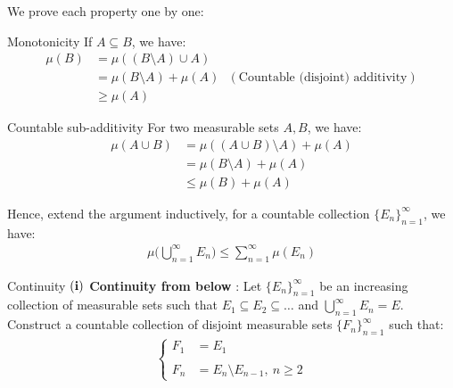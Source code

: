 \begin{proof*}
    We prove each property one by one:
    \begin{subproof}{\newline Monotonicity}
        If $A \subseteq B$, we have:
        \begin{align*}
            \mu(B) &= \mu((B\setminus A) \cup A) \\
            &= \mu(B \setminus A) + \mu(A) \ \ \ (\text{Countable (disjoint) additivity}) \\
            &\ge \mu(A)
        \end{align*}
    \end{subproof}

    \begin{subproof}{\newline Countable sub-additivity}
        For two measurable sets $A, B$, we have:
        \begin{align*}
            \mu(A\cup B) &= \mu((A\cup B)\setminus A) + \mu(A) \\
            &= \mu(B\setminus A) + \mu(A) \\
            &\le \mu(B) + \mu(A)
        \end{align*}

        \noindent Hence, extend the argument inductively, for a countable collection $\{E_n\}_{n=1}^\infty$, we have:
        \begin{align*}
            \mu\Big( \bigcup_{n=1}^\infty E_n \Big) \le \sum_{n=1}^\infty \mu(E_n)
        \end{align*}
    \end{subproof}

    \begin{subproof}{\newline Continuity}
        \textbf{$\bf (i)$ Continuity from below} : Let $\{E_n\}_{n=1}^\infty$ be an increasing collection of measurable sets such that $E_1\subseteq E_2 \subseteq \dots$ and $\bigcup_{n=1}^\infty E_n = E$. Construct a countable collection of disjoint measurable sets $\{F_n\}_{n=1}^\infty$ such that:
        \begin{align*}
            \begin{cases}
                F_1 &= E_1
                \\ \\
                F_n &= E_n \setminus E_{n-1}, \ n \ge 2
            \end{cases}
        \end{align*}


\end{subproof}
\end{proof*}
